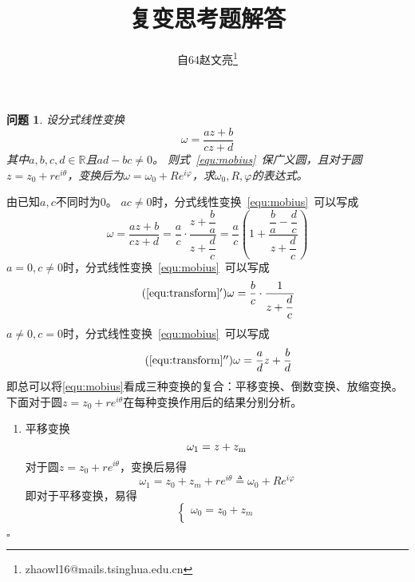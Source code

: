 \documentclass{article}
\title{复变思考题解答}
\author{自64\qquad 赵文亮\qquad 2016011452\thanks{zhaowl16@mails.tsinghua.edu.cn}}
\newtheorem{QUESTION}{问题}
\newenvironment{SOLUTION}[1][{}]{{\noindent\heiti 解#1：}}{\hfill $\square$\par}
\begin{document}
    \maketitle
    \begin{QUESTION}
    设分式线性变换
    \begin{equation}
    \omega = \frac{az+b}{cz+d}
    \label{equ:mobius}
    \end{equation}
    其中$a,b,c,d\in\mathbb{R}$且$ad-bc\neq 0$。
    则式~\eqref{equ:mobius}~保广义圆，且对于圆$z=z_0+re^{i\theta}$，变换后为$\omega = \omega_0+Re^{i\varphi }$，求$\omega_0,R,\varphi$的表达式。
    \end{QUESTION}
    
    \begin{SOLUTION}
    由已知$a,c$不同时为0。
    $ac\neq 0$时，分式线性变换~\eqref{equ:mobius}~可以写成
    \begin{equation}
    \omega = \dfrac{az+b}{cz+d}=\dfrac{a}{c}\cdot\dfrac{z+\dfrac{b}{a}}{z+\dfrac{d}{c}}=\dfrac{a}{c}\left(1+\dfrac{\dfrac{b}{a}-\dfrac{d}{c}}{z+\dfrac{d}{c}}\right)
    \label{equ:transform}
    \end{equation}
    $a=0,c\neq 0$时，分式线性变换~\eqref{equ:mobius}~可以写成
    \begin{equation}
        \tag{\ref{equ:transform}$'$}
        \omega = \dfrac{b}{c}\cdot\dfrac{1}{z+\dfrac{d}{c}}
        \label{equ:transform'}
    \end{equation}
    $a\neq 0, c=0$时，分式线性变换~\eqref{equ:mobius}~可以写成
    \begin{equation}
        \tag{\ref{equ:transform}$''$}
        \omega = \dfrac{a}{d}z+\dfrac{b}{d}
        \label{equ:transform''}
    \end{equation}
    即总可以将\eqref{equ:mobius}看成三种变换的复合：平移变换、倒数变换、放缩变换。下面对于圆$z=z_0+re^{i\theta}$在每种变换作用后的结果分别分析。
    \begin{enumerate}
    \item 平移变换
    \begin{equation}
    \omega_1 = z+z_{\rm m}
    \end{equation}
    对于圆$z=z_0+re^{i\theta}$，变换后易得
    \begin{equation}
    \omega_1=z_0+z_m+re^{i\theta}\triangleq \omega_0+Re^{i\varphi}
    \end{equation}
    即对于平移变换，易得
    \begin{equation}
    \begin{cases}
    \omega_0 =z_0+z_m\\

\end{cases}
\end{equation}
\end{enumerate}
\end{SOLUTION}
\end{document}
